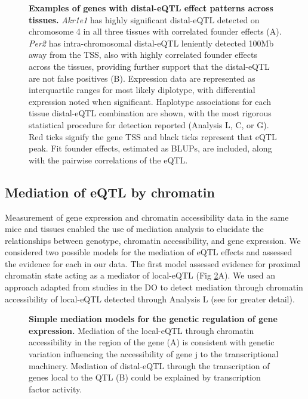 \documentclass[10pt,letterpaper]{article}
\begin{document}
\begin{figure}[h!]
\caption{\textbf{Examples of genes with distal-eQTL effect patterns across tissues.} \textit{Akr1e1} has highly significant distal-eQTL detected on chromosome 4 in all three tissues with correlated founder effects (A). \textit{Per2} has intra-chromosomal distal-eQTL leniently detected 100Mb away from the TSS, also with highly correlated founder effects across the tissues, providing further support that the distal-eQTL are not false positives (B). 
Expression data are represented as interquartile ranges for most likely diplotype, with differential expression noted when significant. Haplotype associations for each tissue distal-eQTL combination are shown, with the most rigorous statistical procedure for detection reported (Analysis L, C, or G). Red ticks signify the gene TSS and black ticks represent that eQTL peak. Fit founder effects, estimated as BLUPs, are included, along with the pairwise correlations of the eQTL. 
\label{fig:correlated_distal_eqtl}}
\end{figure}

\subsection*{Mediation of eQTL by chromatin}

Measurement of gene expression and chromatin accessibility data in the same mice and tissues enabled the use of mediation analysis to elucidate the relationships between genotype, chromatin accessibility, and gene expression. 
We considered two possible models for the mediation of eQTL effects and assessed the evidence for each in our data.
The first model assessed evidence for proximal chromatin state acting as a mediator of local-eQTL (Fig \ref{fig:graph}A). We used an approach adapted from studies in the DO \cite{Chick2016} to detect mediation through chromatin accessibility of local-eQTL detected through Analysis L (see  for greater detail).  

\begin{figure}[h!]
\caption{{\bf Simple mediation models for the genetic regulation of gene expression.} 
Mediation of the local-eQTL through chromatin accessibility in the region of the gene (A) is consistent with genetic variation influencing the accessibility of gene j to the transcriptional machinery. Mediation of distal-eQTL through the transcription of genes local to the QTL (B) could be explained by transcription factor activity.
\label{fig:graph}}
\end{figure}
\end{document}
